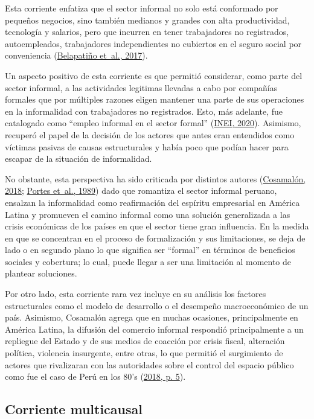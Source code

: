 \documentclass[
  letterpaper,
  12pt,
  oneside,
  spanish,
  doublespacing,
  headsepline,
  parskip]{MastersDoctoralThesis}
\begin{document}
Esta corriente enfatiza que el sector informal no solo está conformado
por pequeños negocios, sino también medianos y grandes con alta
productividad, tecnología y salarios, pero que incurren en tener
trabajadores no registrados, autoempleados, trabajadores independientes
no cubiertos en el seguro social por conveniencia
(\protect\hyperlink{ref-belapatiuxf1o2017}{Belapatiño et~al., 2017}).

Un aspecto positivo de esta corriente es que permitió considerar, como
parte del sector informal, a las actividades legitimas llevadas a cabo
por compañías formales que por múltiples razones eligen mantener una
parte de sus operaciones en la informalidad con trabajadores no
registrados. Esto, más adelante, fue catalogado como ``empleo informal
en el sector formal'' (\protect\hyperlink{ref-inei2020}{INEI, 2020}).
Asimismo, recuperó el papel de la decisión de los actores que antes eran
entendidos como víctimas pasivas de causas estructurales y había poco
que podían hacer para escapar de la situación de informalidad.

No obstante, esta perspectiva ha sido criticada por distintos autores
(\protect\hyperlink{ref-cosamaluxf3n2018}{Cosamalón, 2018};
\protect\hyperlink{ref-theinfo1989}{Portes et~al., 1989}) dado que
romantiza el sector informal peruano, ensalzan la informalidad como
reafirmación del espíritu empresarial en América Latina y promueven el
camino informal como una solución generalizada a las crisis económicas
de los países en que el sector tiene gran influencia. En la medida en
que se concentran en el proceso de formalización y sus limitaciones, se
deja de lado o en segundo plano lo que significa ser ``formal'' en
términos de beneficios sociales y cobertura; lo cual, puede llegar a ser
una limitación al momento de plantear soluciones.

Por otro lado, esta corriente rara vez incluye en su análisis los
factores estructurales como el modelo de desarrollo o el desempeño
macroeconómico de un país. Asimismo, Cosamalón agrega que en muchas
ocasiones, principalmente en América Latina, la difusión del comercio
informal respondió principalmente a un repliegue del Estado y de sus
medios de coacción por crisis fiscal, alteración política, violencia
insurgente, entre otras, lo que permitió el surgimiento de actores que
rivalizaran con las autoridades sobre el control del espacio público
como fue el caso de Perú en los 80's
(\protect\hyperlink{ref-cosamaluxf3n2018}{2018, p. 5}).

\hypertarget{corriente-multicausal}{%
\subsection{Corriente multicausal}\label{corriente-multicausal}}
\end{document}
